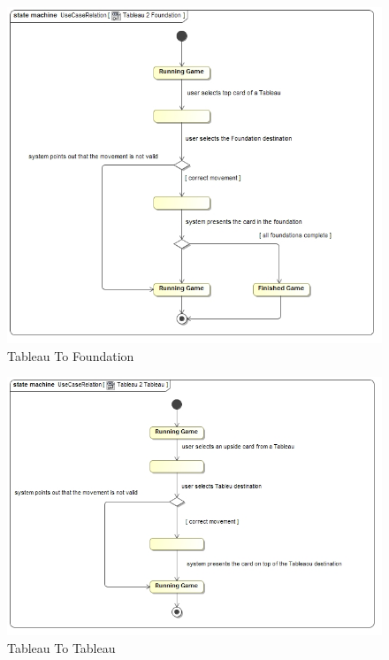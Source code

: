 \documentclass[11pt]{article}
\begin{document}
\begin{center}
 \begin{figure}[H]
 \begin{center}
   \includegraphics[width=14cm]{DomainModel/Tableau2Foundation.jpg}
   \caption{Tableau To Foundation}
   \label{fig:tableau2foundation}
 \end{center}
 \end{figure}
\end{center}

\begin{center}
 \begin{figure}[H]
 \begin{center}
   \includegraphics[width=14cm]{DomainModel/Tableau2Tableau.jpg}
   \caption{Tableau To Tableau}
   \label{fig:tableau2tableau}
 \end{center}
 \end{figure}
\end{center}
\end{document}
